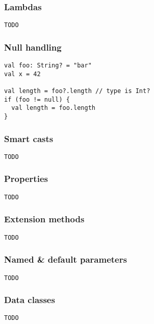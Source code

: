 \begin{frame}[fragile] \frametitle{Lambdas}
\begin{lstlisting}
TODO
\end{lstlisting}
\end{frame}

\begin{frame}[fragile]
	\frametitle{Null handling}
\begin{lstlisting}
val foo: String? = "bar"
val x = 42

val length = foo?.length // type is Int?
if (foo != null) {
  val length = foo.length
}
\end{lstlisting}
\end{frame}


\begin{frame}[fragile] \frametitle{Smart casts}
\begin{lstlisting}
TODO
\end{lstlisting}
\end{frame}


\begin{frame}[fragile] \frametitle{Properties}
\begin{lstlisting}
TODO
\end{lstlisting}
\end{frame}


\begin{frame}[fragile] \frametitle{Extension methods}
\begin{lstlisting}
TODO
\end{lstlisting}
\end{frame}


\begin{frame}[fragile] \frametitle{Named \& default parameters}
\begin{lstlisting}
TODO
\end{lstlisting}
\end{frame}


\begin{frame}[fragile] \frametitle{Data classes}
\begin{lstlisting}
TODO
\end{lstlisting}
\end{frame}



